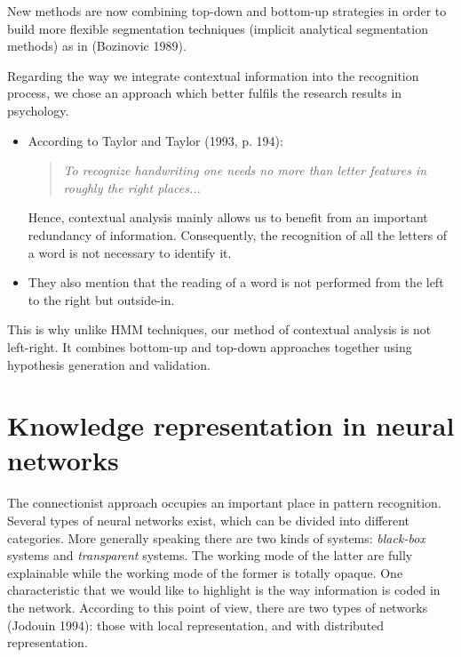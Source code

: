 \documentclass[ijdar]{svjour}
\begin{document}
New methods are now combining top-down and bot\-tom-up strategies in
order to build more flexible segmentation techniques (implicit
analytical segmentation methods) as in (Bozinovic 1989).

Regarding the way we integrate contextual information into the
recognition process, we chose an approach which better fulfils the
research results in psychology.

\begin{itemize}

\item According to Taylor and Taylor (1993, p. 194):

\medskip

\begin{quote}
{\it To recognize handwriting one needs no more than letter features
in roughly the right places...}
\end{quote}

\medskip \noindent
Hence, contextual analysis mainly allows us to benefit from an important
redundancy of information. Consequently, the recognition of all the
letters of a word is not necessary to identify it.

\item They also mention that the reading of a word is not
performed from the left to the right but outside-in.

\end{itemize}

\noindent This is why unlike HMM techniques, our method of
contextual analysis is not left-right. It combines bottom-up and
top-down approaches together using hypothesis generation and
validation.

\section{Knowledge representation in neural networks}
\label{SECNN}

The connectionist approach occupies an important place in pattern
recognition. Several types of neural networks exist, which can be
divided into different categories.\break
More generally speaking there are two
kinds of systems: {\it black-box} systems and {\it transparent} systems.
The working mode of the latter are fully explainable while the working
mode of the former is totally opaque. One characteristic that we would
like to highlight is the way information is coded in the network.
According to this point of view, there are two types of networks
(Jodouin 1994): those with local representation, and with distributed
representation.
\end{document}
